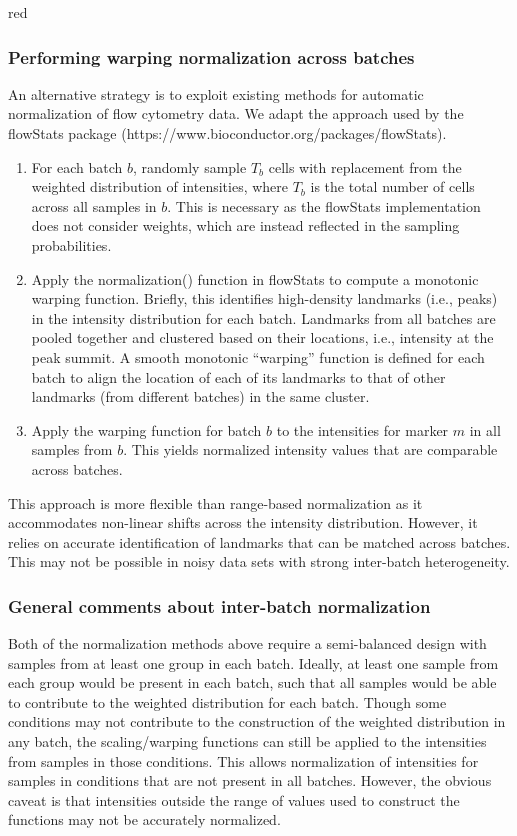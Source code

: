 \documentclass{article}
\begin{document}
\begin{color}{red}
\subsubsection{Performing warping normalization across batches}
An alternative strategy is to exploit existing methods for automatic normalization of flow cytometry data.
We adapt the approach used by the flowStats package (https://www.bioconductor.org/packages/flowStats).
\begin{enumerate}
    \item For each batch $b$, randomly sample $T_b$ cells with replacement from the weighted distribution of intensities,
        where $T_b$ is the total number of cells across all samples in $b$.
        This is necessary as the flowStats implementation does not consider weights, which are instead reflected in the sampling probabilities.
    \item Apply the normalization() function in flowStats to compute a monotonic warping function.
        Briefly, this identifies high-density landmarks (i.e., peaks) in the intensity distribution for each batch.
        Landmarks from all batches are pooled together and clustered based on their locations, i.e., intensity at the peak summit.
        A smooth monotonic ``warping'' function \cite{ramsay2002applied} is defined for each batch to align the location of each of its landmarks to that of other landmarks (from different batches) in the same cluster.
    \item Apply the warping function for batch $b$ to the intensities for marker $m$ in all samples from $b$.
        This yields normalized intensity values that are comparable across batches.
\end{enumerate}
This approach is more flexible than range-based normalization as it accommodates non-linear shifts across the intensity distribution.
However, it relies on accurate identification of landmarks that can be matched across batches.
This may not be possible in noisy data sets with strong inter-batch heterogeneity.

\subsubsection{General comments about inter-batch normalization}
Both of the normalization methods above require a semi-balanced design with samples from at least one group in each batch.
Ideally, at least one sample from each group would be present in each batch, such that all samples would be able to contribute to the weighted distribution for each batch.
Though some conditions may not contribute to the construction of the weighted distribution in any batch, the scaling/warping functions can still be applied to the intensities from samples in those conditions.
This allows normalization of intensities for samples in conditions that are not present in all batches.
However, the obvious caveat is that intensities outside the range of values used to construct the functions may not be accurately normalized.


\end{color}
\end{document}
